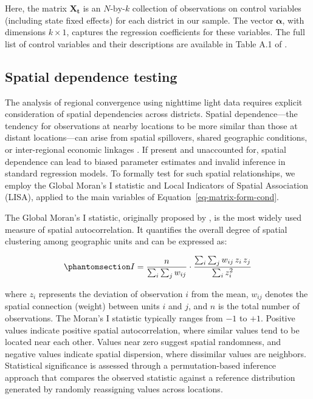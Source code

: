 \documentclass[
  a4paper, 
  twoside,
  review
]{article}
\begin{document}
Here, the matrix \(\boldsymbol{X_t}\) is an \(N\text{-by-}k\) collection
of observations on control variables (including state fixed effects) for
each district in our sample. The vector \(\boldsymbol{\alpha}\), with
dimensions \(k \times 1\), captures the regression coefficients for
these variables. The full list of control variables and their
descriptions are available in Table A.1 of
\citet{chanda_kabiraj_district_convergence}.

\subsection{Spatial dependence
testing}\label{spatial-dependence-testing}

The analysis of regional convergence using nighttime light data requires
explicit consideration of spatial dependencies across districts. Spatial
dependence---the tendency for observations at nearby locations to be
more similar than those at distant locations---can arise from spatial
spillovers, shared geographic conditions, or inter-regional economic
linkages \citep{anselin_spatial_analysis}. If present and unaccounted
for, spatial dependence can lead to biased parameter estimates and
invalid inference in standard regression models. To formally test for
such spatial relationships, we employ the Global Moran's I statistic and
Local Indicators of Spatial Association (LISA), applied to the main
variables of Equation~\ref{eq-matrix-form-cond}.

The Global Moran's I statistic, originally proposed by
\citet{moran_spatial_autocorrelation}, is the most widely used measure
of spatial autocorrelation. It quantifies the overall degree of spatial
clustering among geographic units and can be expressed as:

\begin{equation}\phantomsection\label{eq-moran}{
I=\frac{n}{\sum_i \sum_j w_{ij}} \cdot \frac{\sum_i \sum_j w_{ij} \, z_i \, z_j}{\sum_i z_i^2}
}\end{equation}

where \(z_i\) represents the deviation of observation \(i\) from the
mean, \(w_{ij}\) denotes the spatial connection (weight) between units
\(i\) and \(j\), and \(n\) is the total number of observations. The
Moran's I statistic typically ranges from \(-1\) to \(+1\). Positive
values indicate positive spatial autocorrelation, where similar values
tend to be located near each other. Values near zero suggest spatial
randomness, and negative values indicate spatial dispersion, where
dissimilar values are neighbors. Statistical significance is assessed
through a permutation-based inference approach that compares the
observed statistic against a reference distribution generated by
randomly reassigning values across locations.
\end{document}
